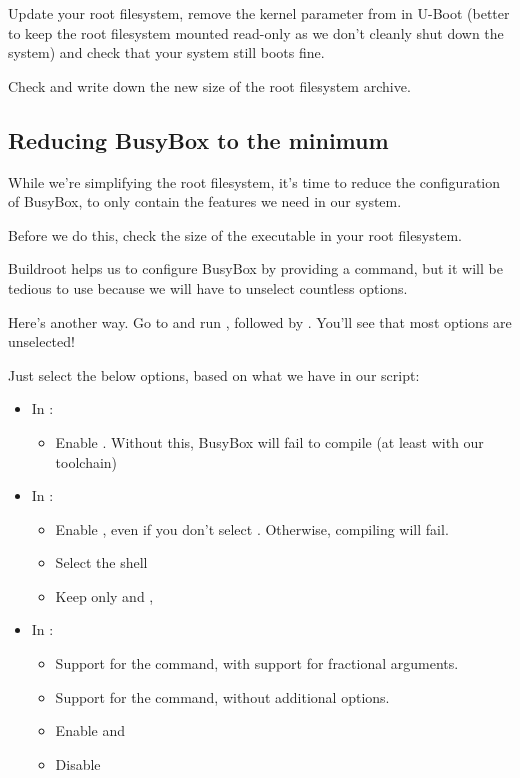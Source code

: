 Update your root filesystem, remove the  kernel parameter from
 in U-Boot (better to keep the root filesystem mounted read-only as we don't
cleanly shut down the system) and check that your system still boots fine.

Check and write down the new size of the root filesystem archive.

\subsection{Reducing BusyBox to the minimum}

While we're simplifying the root filesystem, it's time to reduce the
configuration of BusyBox, to only contain the features we need in our
system.

Before we do this, check the size of the  executable in
your root filesystem.

Buildroot helps us to configure BusyBox by providing a  command, but it will be tedious to use because we
will have to unselect countless options.

Here's another way. Go to  and run
, followed by . You'll see
that most options are unselected!

Just select the below options, based on what we have in our
 script:
\begin{itemize}
  \item In :
  \begin{itemize}
     \item Enable . Without this, BusyBox
           will fail to compile (at least with our toolchain)
  \end{itemize}
  \item In :
  \begin{itemize}
     \item Enable , even
	   if you don't select . Otherwise, compiling
            will fail.
     \item Select the  shell
     \item Keep only  and
           ,
  \end{itemize}
  \item In :
  \begin{itemize}
     \item Support for the  command, with support for fractional arguments.
     \item Support for the  command, without additional options.
     \item Enable  and \code{test as [}
     \item Disable 
  \end{itemize}
\end{itemize}


